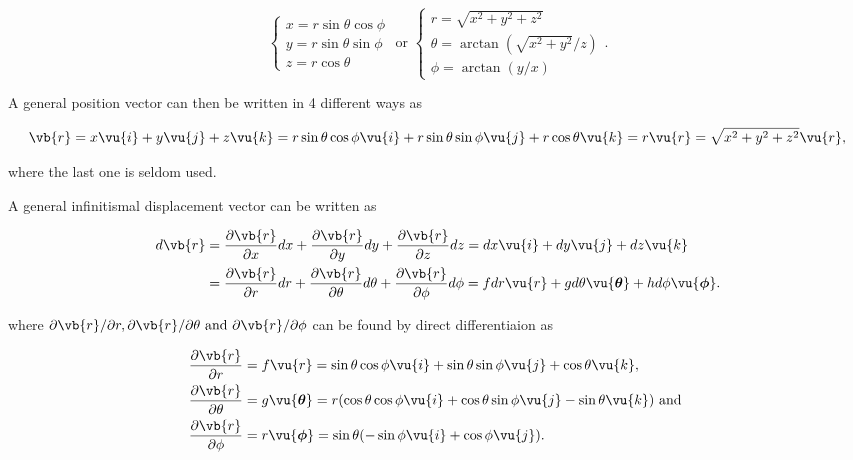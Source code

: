 \documentclass[english,a4paper,12pt]{report}
\begin{document}
\begin{equation}
    \begin{cases} x = r\sin \theta \cos \phi \\ y = r\sin \theta \sin \phi \\ z = r\cos \theta \end{cases} \text { or } \begin{cases} r = \sqrt{x^2+y^2+z^2} \\  \theta = \arctan {\left(\sqrt{x^2+y^2}/z   \right)} \\  \phi = \arctan {\left(y /x\right)} \end{cases}. 
\end{equation}

A general position vector can then be written in 4 different ways as 

\begin{equation}
    \vb{r} = x \vu{i} + y \vu{j} + z \vu{k} = r\sin \theta \cos \phi \vu{i} + r\sin \theta \sin \phi \vu{j} + r \cos \theta \vu{k} = r \vu{r} = \sqrt{x^2+y^2+z^2}\vu{r}, 
\end{equation}

where the last one is seldom used.

A general infinitismal displacement vector can be written as 

\begin{equation}
    \begin{aligned}
    d \vb{r} &= \frac{\partial \vb{r} }{\partial x} dx + \frac{\partial \vb{r} }{\partial y} dy + \frac{\partial \vb{r} }{\partial z} dz = dx \vu{i} + dy \vu{j} + dz \vu{k} \\ &= \frac{\partial \vb{r} }{\partial r} dr + \frac{\partial \vb{r} }{\partial \theta }d\theta + \frac{\partial \vb{r} }{\partial \phi }d \phi =f dr \vu{r} +g d\theta \vu{\boldsymbol{\theta } } +h  d \phi \vu{\boldsymbol{\phi } }. 
    \end{aligned}
\end{equation}

where \(\partial \vb{r} /\partial r, \partial \vb{r} /\partial \theta \text { and } \partial \vb{r} /\partial \phi \) can be found by direct differentiaion as 

\begin{equation}
	\begin{aligned} 
		\frac{\partial \vb{r} }{\partial r}   &= f \vu{r} = \sin{\theta}\cos{\phi}\vu{i} + \sin{\theta}\sin{\phi}\vu{j} + \cos{\theta}\vu{k}, \\
		\frac{\partial \vb{r} }{\partial \theta }  &= g \vu{\boldsymbol{\theta }} = r(\cos{\theta}\cos{\phi}\vu{i} + \cos{\theta}\sin{\phi}\vu{j} - \sin{\theta}\vu{k})\text { and }  \\
		\frac{\partial \vb{r} }{\partial \phi }  &= r \vu{\boldsymbol{\phi } } = \sin \theta (-\sin{\phi}\vu{i} + \cos{\phi}\vu{j}). 
	\end{aligned} 
\end{equation}
\end{document}
